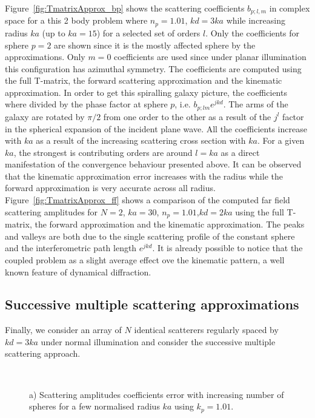 Figure~\ref{fig:TmatrixApprox_bp} shows the scattering coefficients $b_{p;l,m}$
in complex space for a this 2 body problem where $n_p=1.01$, $kd=3ka$
while increasing radius $ka$ (up to $ka=15$) for a selected set of orders $l$.
Only the coefficients for sphere $p=2$ are shown since it is the mostly affected
sphere by the approximations. Only $m=0$ coefficients are used since under
planar illumination this configuration has azimuthal symmetry.
The coefficients are computed using the full T-matrix, the forward
scattering approximation and the kinematic approximation. In order to get this
spiralling galaxy picture, the coefficients where divided by the phase factor at
sphere $p$, i.e. $b_{p;lm}e^{jkd}$. The arms of the galaxy are rotated by $\pi/2$
from one order to the other as a result of the $j^l$ factor in the spherical expansion
of the incident plane wave. All the coefficients increase with $ka$ as a result of
the increasing scattering cross section with $ka$. For a given $ka$, the strongest
is contributing orders are around $l=ka$ as a direct manifestation of the convergence
behaviour presented above. It can be observed that the kinematic approximation
error increases with the radius while the forward approximation is very accurate
across all radius.
Figure~\ref{fig:TmatrixApprox_ff} shows a comparison of the computed far field
scattering amplitudes for $N=2$, $ka=30$, $n_p=1.01$,$kd=2ka$ using the full
T-matrix, the forward approximation and the kinematic approximation. The peaks and
valleys are both due to the single scattering profile of the constant sphere and
the interferometric path length $e^{jkd}$. It is already possible to notice
that the coupled problem as a slight average effect ove the kinematic pattern, a
well known feature of dynamical diffraction.




\subsection{Successive multiple scattering approximations}

Finally, we consider an array of $N$ identical scatterers regularly spaced by
$kd=3ka$ under normal illumination and consider the successive multiple scattering
approach.

\begin{figure}[h!]
  \centering
  \\
  \vspace{-1.1em}
\caption{
a) Scattering amplitudes coefficients error with increasing number of spheres
for a few normalised radius $ka$ using $k_p=1.01$.
}%
\end{figure}

